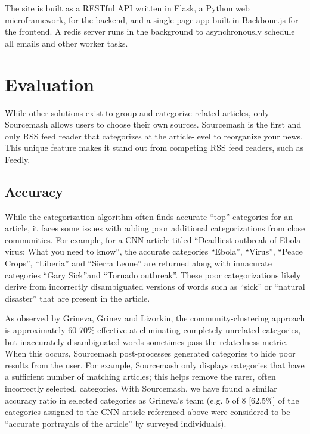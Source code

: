 \documentclass[11pt]{article}
\begin{document}
The site is built as a RESTful API written in Flask, a Python web microframework, for the backend, and a single-page app built in Backbone.js for the frontend. A redis server runs in the background to asynchronously schedule all emails and other worker tasks.


\section{Evaluation}

While other solutions exist to group and categorize related articles, only Sourcemash allows users to choose their own sources. Sourcemash is the first and only RSS feed reader that categorizes at the article-level to reorganize your news. This unique feature makes it stand out from competing RSS feed readers, such as Feedly.

\subsection{Accuracy}
While the categorization algorithm often finds accurate ``top'' categories for an article, it faces some issues with adding poor additional categorizations from close communities. For example, for a CNN article titled ``Deadliest outbreak of Ebola virus: What you need to know''\cite{Ebola}, the accurate categories ``Ebola'', ``Virus'', ``Peace Crops'', ``Liberia'' and ``Sierra Leone'' are returned along with innacurate categories ``Gary Sick''and ``Tornado outbreak''. These poor categorizations likely derive from incorrectly disambiguated versions of words such as ``sick'' or ``natural disaster'' that are present in the article. 

As observed by Grineva, Grinev and Lizorkin\cite{Grineva}, the community-clustering approach is approximately 60-70\% effective at eliminating completely unrelated categories, but inaccurately disambiguated words sometimes pass the relatedness metric. When this occurs, Sourcemash post-processes generated categories to hide poor results from the user. For example, Sourcemash only displays categories that have a sufficient number of matching articles; this helps remove the rarer, often incorrectly selected, categories. With Sourcemash, we have found a similar accuracy ratio in selected categories as Grineva's team (e.g. 5 of 8 [62.5\%] of the categories assigned to the CNN article\cite{Ebola} referenced above were considered to be ``accurate portrayals of the article'' by surveyed individuals). 
\end{document}

